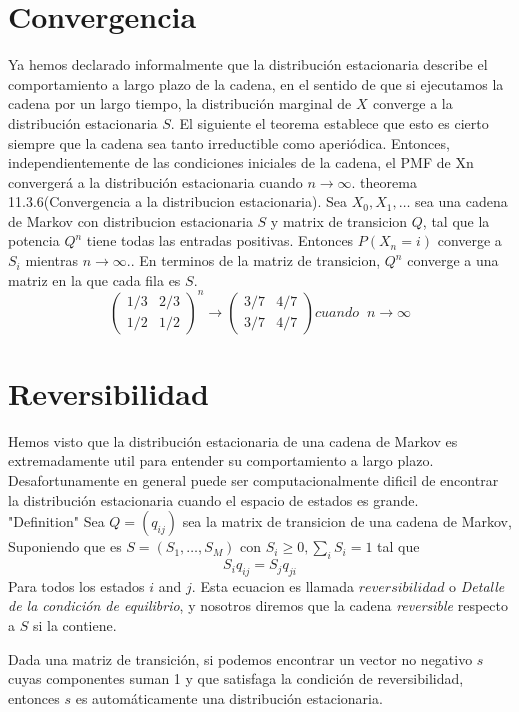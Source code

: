 \section{Convergencia}
Ya hemos declarado informalmente que la distribución estacionaria describe el
comportamiento a largo plazo de la cadena, en el sentido de que si ejecutamos la cadena por un largo tiempo,
la distribución marginal de $X_{}$ converge a la distribución estacionaria $S$. El siguiente
el teorema establece que esto es cierto siempre que la cadena sea tanto irreductible como aperiódica.
Entonces, independientemente de las condiciones iniciales de la cadena, el PMF de Xn convergerá a la distribución estacionaria cuando  $n \longrightarrow \infty.$ 
theorema 11.3.6(Convergencia a la distribucion estacionaria). Sea $X_0,X_1,\dots $ sea una cadena de Markov con distribucion estacionaria $S$ y matrix de transicion $Q$, tal que la potencia $Q^{n}$ tiene todas las entradas positivas. Entonces $P(X_{n}=i)$ converge a $S_{i}$ mientras  $n \longrightarrow \infty.$. En terminos de la matriz de transicion, $Q^{n}$ converge a una matriz en la que cada fila es $S$.\\


\[
\left( \begin{array}{cccc}
1/3 & 2/3 \\
1/2 & 1/2 \end{array}  \right)^{n}
\rightarrow
\left( \begin{array}{cccc}
3/7 & 4/7 \\
3/7 & 4/7 \end{array}  \right)
cuando \phantom{x} n \rightarrow \infty
\]
\section{Reversibilidad}
Hemos visto que la distribución estacionaria de una cadena de Markov es extremadamente util para entender su comportamiento a largo plazo. Desafortunamente en general puede ser computacionalmente dificil de encontrar la distribución estacionaria cuando el espacio de estados es grande.\\
"Definition" Sea $Q = (q_{ij})$ sea la matrix de transicion de una cadena de Markov, Suponiendo que es $S=(S_1,\dots,S_M)$ con $S_i\geq0, \sum_{i}S_i = 1$ tal que $$S_{i}q_{ij}=S_{j}q_{ji}$$ Para todos los estados $i$ and $j$. Esta ecuacion es llamada $reversibilidad$ o \textit{Detalle de la condición de equilibrio}, y nosotros diremos que la cadena \textit{reversible} respecto a $S$ si la contiene.

Dada una matriz de transición, si podemos encontrar un vector no negativo $s$ cuyas componentes suman 1 y que satisfaga la condición de reversibilidad, entonces $s$ es automáticamente una distribución estacionaria.